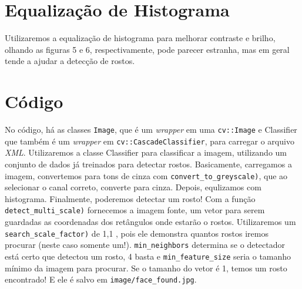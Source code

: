 \documentclass[12pt]{article}
\def\code#1{\texttt{#1}}
\begin{document}
	\section{Equalização de Histograma}
	
	Utilizaremos a equalização de histograma para melhorar contraste e brilho, olhando as figuras 5 e 6, respectivamente, pode parecer estranha, mas em geral tende a ajudar a detecção de rostos.
	
	\section{Código}
	No código, há as classes 
	\code{Image}, que é um \textit{wrapper} em uma \code{cv::Image} e Classifier que também é um \textit{wrapper} em \code{cv::CascadeClassifier}, para carregar o arquivo \textit{XML}. Utilizaremos a classe Classifier para classificar a imagem, utilizando um conjunto de dados já treinados para detectar rostos.
	Basicamente, carregamos a imagem, convertemos para tons de cinza com \code{convert\_to\_greyscale)}, que ao selecionar o canal correto, converte para cinza. Depois, equlizamos com histograma.
	Finalmente, poderemos detectar um rosto! Com a função \code{detect\_multi\_scale)} fornecemos a imagem fonte, um vetor para serem guardadas as coordenadas dos retângulos onde estarão o rostos. Utilizaremos um \code{search\_scale\_factor)} de 1,1 , pois ele demonstra quantos rostos iremos procurar (neste caso somente um!). \code{min\_neighbors}
	determina se o detectador está certo que detectou um rosto, 4 basta e \code{min\_feature\_size} seria o tamanho mínimo da imagem para procurar. 
	Se o tamanho do vetor é 1, temos um rosto encontrado!
	E ele é salvo em \code{image/face\_found.jpg}.
	
	
	
	
	
		
	
\end{document}
